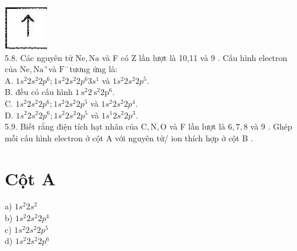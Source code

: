 \documentclass[10pt]{article}
\begin{document}
\includegraphics[max width=\textwidth, center]{2025_10_23_76620c17ffac1ae9b35bg-12(5)}\\
5.8. Các nguyên tử $\mathrm{Ne}, \mathrm{Na}$ và F có Z lần lượt là 10,11 và 9 . Cấu hình electron của $\mathrm{Ne}, \mathrm{Na}^{+}$và $\mathrm{F}^{-}$tương ứng là:\\
A. $1 s^{2} 2 s^{2} 2 p^{6} ; 1 s^{2} 2 s^{2} 2 p^{6} 3 s^{1}$ và $1 s^{2} 2 s^{2} 2 p^{5}$.\\
B. đều có cấu hình $1 \mathrm{~s}^{2} 2 \mathrm{~s}^{2} 2 \mathrm{p}^{6}$.\\
C. $1 s^{2} 2 s^{2} 2 p^{6} ; 1 s^{2} 2 s^{2} 2 p^{5}$ và $1 s^{2} 2 s^{2} 2 p^{4}$.\\
D. $1 s^{2} 2 s^{2} 2 p^{6} ; 1 s^{2} 2 s^{2} 2 p^{5}$ và $1 s^{1} 2 s^{2} 2 p^{3}$.\\
5.9. Biết rằng điện tích hạt nhân của $\mathrm{C}, \mathrm{N}, \mathrm{O}$ và F lần lượt là $6,7,8$ và 9 . Ghép mỗi cấu hình electron ở cột A với nguyên tử/ ion thích hợp ở cột B .

\section*{Cột A}
a) $1 s^{2} 2 s^{2}$\\
b) $1 s^{2} 2 s^{2} 2 p^{4}$\\
c) $1 s^{2} 2 s^{2} 2 p^{5}$\\
d) $1 s^{2} 2 s^{2} 2 p^{6}$
\end{document}
